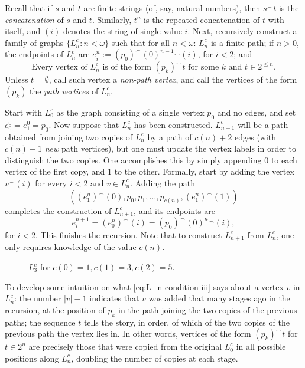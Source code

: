 \documentclass[12pt]{article}
\begin{document}
Recall that if $s$ and $t$ are finite strings (of, say, natural numbers), then $s^\frown t$ is the \emph{concatenation} of $s$ and $t$.
Similarly, $t^n$ is the repeated concatenation of $t$ with itself, and $(i)$ denotes the string of single value $i$.
Next, recursively construct a family of graphs $\{L^c_n:n<\omega\}$ such that for all $n<\omega$:
$L^c_n$ is a finite path; if $n>0$, the endpoints of $L^c_n$ are $e_i^n:=(p_0)^\smallfrown(0)^{n-1}{}^\smallfrown(i)$, for $i<2$; and
\begin{equation}
\text{Every vertex of }L^c_n\text{ is of the form }(p_k)^\smallfrown t\text{ for some }k\text{ and }t\in2^{\leq n}.\label{eq:L_n-condition-iii}\end{equation}
Unless $t=\emptyset$, call such vertex a \emph{non-path vertex}, and call the vertices of the form $(p_k)$ the \emph{path vertices} of $L^c_n$.


Start with $L^c_0$ as the graph consisting of a single vertex $p_0$ and no edges, and set $e^0_0=e^0_1=p_0$.
Now suppose that $L^c_n$ has been constructed.
$L^c_{n+1}$ will be a path obtained from joining two copies of $L^c_n$ by a path of $c(n)+2$ edges (with $c(n)+1$ \emph{new} path vertices), but one must update the vertex labels in order to distinguish the two copies.
One accomplishes this by simply appending $0$ to each vertex of the first copy, and $1$ to the other.
Formally, start by adding the vertex $v^\frown(i)$ for every $i<2$ and $v\in L^c_n$.
Adding the path $$((e_1^n)^\smallfrown(0),p_0,p_1,\dots,p_{c(n)},(e_1^n)^\smallfrown(1))$$ completes the construction of $L^c_{n+1}$, and its endpoints are $$e_i^{n+1}=(e_0^n)^\smallfrown(i)=(p_0)^\smallfrown(0)^n{}^\smallfrown(i),$$ for $i<2$.
This finishes the recursion.
Note that to construct $L^c_{n+1}$ from $L^c_n$, one only requires knowledge of the value $c(n)$.

\begin{figure}[ht]
    \centering
    
    \caption{$L_3^c$ for $c(0)=1,c(1)=3,c(2)=5$.}
    \label{fig:L_n}
\end{figure}

To develop some intuition on what \eqref{eq:L_n-condition-iii} says about a vertex $v$ in $L^c_n$: the number $|v|-1$ indicates that $v$ was added that many stages ago in the recursion, at the position of $p_k$ in the path joining the two copies of the previous paths; the sequence $t$ tells the story, in order, of which of the two copies of the previous path the vertex lies in.
In other words, vertices of the form $(p_k)^\smallfrown t$ for $t\in 2^n$ are precisely those that were copied from the original $L^c_0$ in all possible positions along $L^c_n$, doubling the number of copies at each stage.
\end{document}

